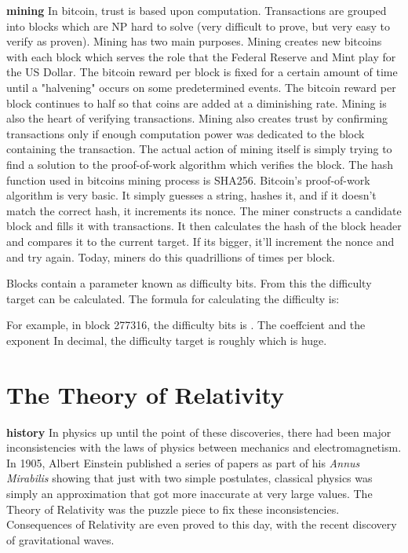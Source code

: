 \documentclass[conference]{IEEEtran}
\begin{document}
\textbf{mining} In bitcoin, trust is based upon computation. Transactions are grouped into blocks which are NP hard to solve (very difficult to prove, but very easy to verify as proven). Mining has two main purposes. Mining creates new bitcoins with each block which serves the role that the Federal Reserve and Mint play for the US Dollar. The bitcoin reward per block is fixed for a certain amount of time until a "halvening" occurs on some predetermined events. The bitcoin reward per block continues to half so that coins are added at a diminishing rate. Mining is also the heart of verifying transactions. Mining also creates trust by confirming transactions only if enough computation power was dedicated to the block containing the transaction. The actual action of mining itself is simply trying to find a solution to the proof-of-work algorithm which verifies the block. The hash function used in bitcoins mining process is SHA256. Bitcoin's proof-of-work algorithm is very basic. It simply guesses a string, hashes it, and if it doesn't match the correct hash, it increments its nonce. The miner constructs a candidate block and fills it with transactions. It then calculates the hash of the block header and compares it to the current target. If its bigger, it’ll increment the nonce and and try again. Today, miners do this quadrillions of times per block. \cite{hashcash}

Blocks contain a parameter known as difficulty bits. From this the difficulty target can be calculated. The formula for calculating the difficulty is: 


For example, in block 277316, the difficulty bits is . The coeffcient  and the exponent  In decimal, the difficulty target is roughly  which is huge. \cite{bitcoincore}

\section{The Theory of Relativity}
\textbf{history} In physics up until the point of these discoveries, there had been major inconsistencies with the laws of physics between mechanics and electromagnetism. In 1905, Albert Einstein published a series of papers as part of his \textit{Annus Mirabilis} showing that just with two simple postulates, classical physics was simply an approximation that got more inaccurate at very large values. The Theory of Relativity was the puzzle piece to fix these inconsistencies. Consequences of Relativity are even proved to this day, with the recent discovery of gravitational waves. \cite{history,waves}
\end{document}
